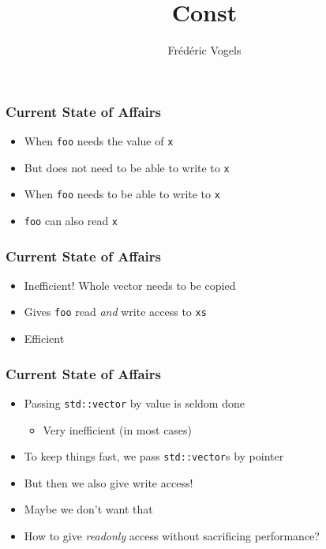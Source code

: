 
\usetikzlibrary{shadows,shapes.multipart}

\title{Const}
\author{Fr\'ed\'eric Vogels}





\begin{frame}
  \titlepage
\end{frame}

\begin{frame}
  \frametitle{Current State of Affairs}
  \begin{itemize}
    \item When \texttt{foo} needs the value of \texttt{x}
    \item But does not need to be able to write to \texttt{x}
  \end{itemize}
  \vskip2mm
  \begin{itemize}
    \item When \texttt{foo} needs to be able to write to \texttt{x}
    \item \texttt{foo} can also read \texttt{x}
  \end{itemize}
\end{frame}

\begin{frame}
  \frametitle{Current State of Affairs}
  \begin{itemize}
    \item Inefficient! Whole vector needs to be copied
  \end{itemize}
  \vskip2mm
  \begin{itemize}
    \item Gives \texttt{foo} read \emph{and} write access to \texttt{xs}
    \item Efficient
  \end{itemize}
\end{frame}

\begin{frame}
  \frametitle{Current State of Affairs}
  \begin{itemize}
    \item Passing \texttt{std::vector} by value is seldom done
          \begin{itemize}
            \item Very inefficient (in most cases)
          \end{itemize}
    \item To keep things fast, we pass \texttt{std::vector}s by pointer
    \item But then we also give write access!
    \item Maybe we don't want that
    \item How to give \emph{readonly} access without sacrificing performance?
  \end{itemize}
\end{frame}

